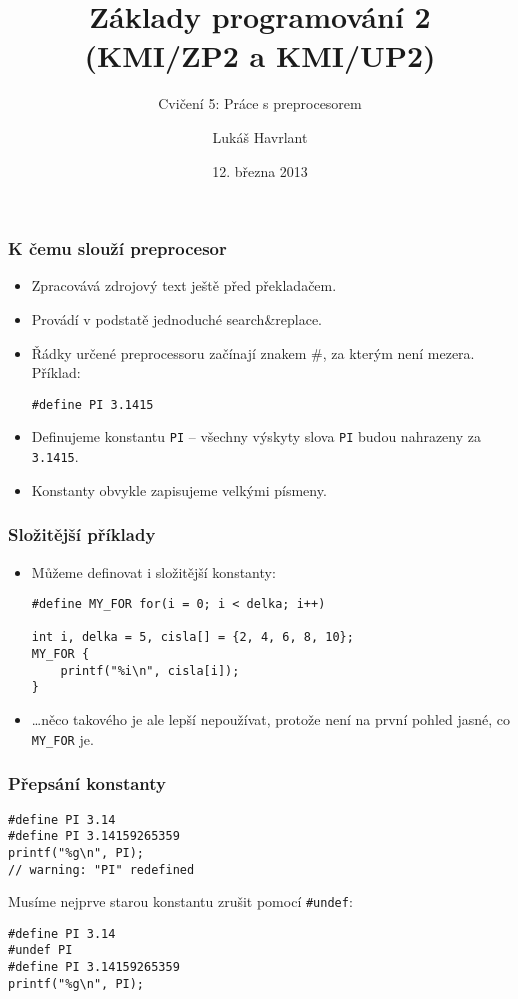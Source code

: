 \documentclass{beamer}
\title{Základy programování 2 (KMI/ZP2 a KMI/UP2)}
\subtitle{Cvičení 5: Práce s preprocesorem}
\author{Lukáš Havrlant}
\date{12. března 2013}
\institute{Univerzita Palackého}
\newenvironment{itemizex}%
  {\large \begin{itemize}%
    \setlength{\itemsep}{8pt}%
    \setlength{\parskip}{8pt}}%
  {\end{itemize}}
\begin{document}
\begin{frame}[t,plain]
\titlepage
\end{frame}


\begin{frame}[t,fragile]\frametitle{K čemu slouží preprocesor} 
    \begin{itemizex}
        \item Zpracovává zdrojový text ještě před překladačem.
        \item Provádí v podstatě jednoduché search\&replace.
        \item Řádky určené preprocessoru začínají znakem \#, za kterým není mezera. Příklad:
\begin{verbatim} 
#define PI 3.1415
\end{verbatim}
        \item Definujeme konstantu \texttt{PI} -- všechny výskyty slova \texttt{PI} budou nahrazeny za \texttt{3.1415}.
        \item Konstanty obvykle zapisujeme velkými písmeny. 
    \end{itemizex}
\end{frame}


\begin{frame}[t,fragile]\frametitle{Složitější příklady} 
    \begin{itemizex}
        \item Můžeme definovat i složitější konstanty:
\begin{verbatim} 
#define MY_FOR for(i = 0; i < delka; i++)

int i, delka = 5, cisla[] = {2, 4, 6, 8, 10};
MY_FOR {
    printf("%i\n", cisla[i]);
}
\end{verbatim}
        \item \dots něco takového je ale lepší nepoužívat, protože není na první pohled jasné, co \texttt{MY\_FOR} je. 
    \end{itemizex}
\end{frame}


\begin{frame}[t,fragile]\frametitle{Přepsání konstanty} 
\begin{verbatim} 
#define PI 3.14
#define PI 3.14159265359
printf("%g\n", PI);
// warning: "PI" redefined
\end{verbatim}

Musíme nejprve starou konstantu zrušit pomocí \texttt{\#undef}:

\begin{verbatim} 
#define PI 3.14
#undef PI
#define PI 3.14159265359
printf("%g\n", PI);
\end{verbatim}
\end{frame}
\end{document}
